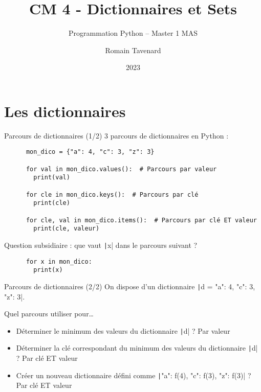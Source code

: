 \documentclass[10pt]{beamer}
\title[M1 MAS -- Python -- Dictionnaires]{CM 4 - Dictionnaires et Sets}
\subtitle{Programmation Python -- Master 1 MAS}
\author{Romain Tavenard}
\date{2023}
\institute{%
\hypersetup{urlcolor=.}
\makebox[2.2ex][c]{\faEnvelope}\enspace\href{mailto:romain.tavenard@univ-rennes2.fr}{\texttt{romain.tavenard@univ-rennes2.fr}}\\%
}
\begin{document}
\maketitle

\section{Les dictionnaires}

\begin{frame}[fragile]{Parcours de dictionnaires (1/2)}  
  3 parcours de dictionnaires en Python :

  \begin{beamercodeblock}
    \begin{verbatim}
      mon_dico = {"a": 4, "c": 3, "z": 3}

      for val in mon_dico.values():  # Parcours par valeur
        print(val)

      for cle in mon_dico.keys():  # Parcours par clé
        print(cle)
      
      for cle, val in mon_dico.items():  # Parcours par clé ET valeur
        print(cle, valeur)
    \end{verbatim}
  \end{beamercodeblock}

  \pause

  Question subsidiaire : que vaut \texttt|x| dans le parcours suivant ?

  \begin{beamercodeblock}
    \begin{verbatim}
      for x in mon_dico:
        print(x)
    \end{verbatim}
  \end{beamercodeblock}
\end{frame}

\begin{frame}[fragile]{Parcours de dictionnaires (2/2)}  
  On dispose d'un dictionnaire \texttt|d = {"a": 4, "c": 3, "z": 3}|.

  Quel parcours utiliser pour\dots

  \begin{itemize}
    \item Déterminer le minimum des valeurs du dictionnaire \texttt|d| ? \pause \alert{Par valeur}
    \item Déterminer la clé correspondant du minimum des valeurs du dictionnaire \texttt|d| ? \pause \alert{Par clé ET valeur}
    \item Créer un nouveau dictionnaire défini comme \texttt|{"a": f(4), "c": f(3), "z": f(3)}| ? \pause \alert{Par clé ET valeur}
  \end{itemize}
\end{frame}
\end{document}

